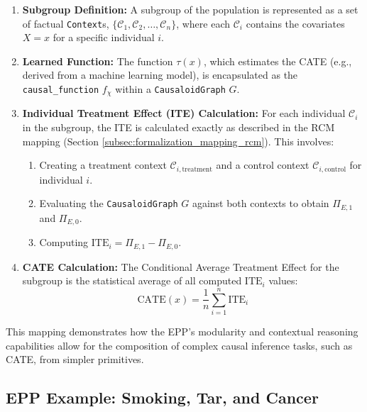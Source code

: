 \begin{enumerate}
	\item \textbf{Subgroup Definition:} A subgroup of the population is represented as a set of factual \texttt{Context}s,
      \(\{\mathcal{C}_1, \mathcal{C}_2, \dots, \mathcal{C}_n\}\), where each \(\mathcal{C}_i\) contains the covariates \(X=x\) for a
      specific individual \(i\).
    
   \item \textbf{Learned Function:} The function \(\tau(x)\), which estimates the CATE (e.g., derived from a machine learning
      model), is encapsulated as the \texttt{causal\_function} \(f_{\chi}\) within a \texttt{CausaloidGraph} \(G\).
    
   \item \textbf{Individual Treatment Effect (ITE) Calculation:} For each individual \(\mathcal{C}_i\) in the subgroup, the ITE
      is calculated exactly as described in the RCM mapping (Section \ref{subsec:formalization_mapping_rcm}). This involves:
   		\begin{enumerate}
         \item Creating a treatment context \(\mathcal{C}_{i,\text{treatment}}\) and a control context \(\mathcal{C}_{i,\text
      {control}}\) for individual \(i\).
          \item Evaluating the \texttt{CausaloidGraph} \(G\) against both contexts to obtain \(\Pi_{E,1}\) and \(\Pi_{E,0}\).
         \item Computing \(\text{ITE}_i = \Pi_{E,1} - \Pi_{E,0}\).
      \end{enumerate}
    
   \item \textbf{CATE Calculation:} The Conditional Average Treatment Effect for the subgroup is the statistical average of all computed \(\text{ITE}_i\) values: \[ \text{CATE}(x) = \frac{1}{n} \sum_{i=1}^{n} \text{ITE}_i \]
\end{enumerate}

This mapping demonstrates how the EPP's modularity and contextual reasoning capabilities allow for the composition of complex causal inference tasks, such as CATE, from simpler primitives.

\newpage

\subsection{EPP Example: Smoking, Tar, and Cancer}
\label{sec:formalization_example_smoking_tar_cancer}

